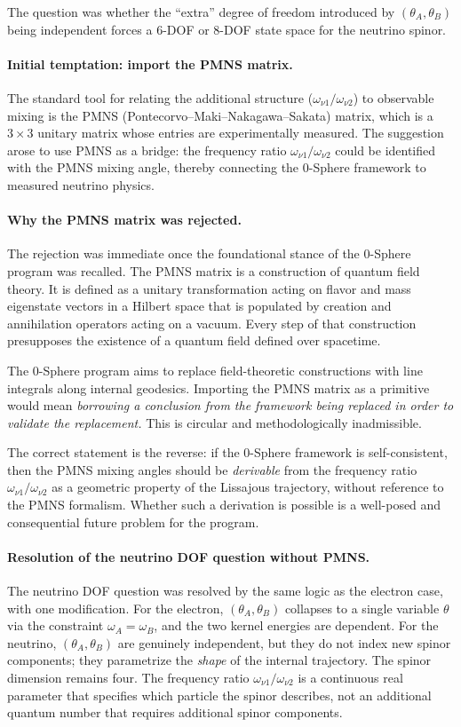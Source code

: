 \documentclass[%
 reprint, amsmath,amssymb, aps, prb, ]{revtex4-2}
\numberwithin{equation}{section}
\begin{document}
The question was whether the ``extra'' degree of freedom introduced by $(\theta_A, \theta_B)$ being independent forces a 6-DOF or 8-DOF state space for the neutrino spinor.

\paragraph{Initial temptation: import the PMNS matrix.}
The standard tool for relating the additional structure ($\omega_{\nu1}/\omega_{\nu2}$) to observable mixing is the PMNS (Pontecorvo--Maki--Nakagawa--Sakata) matrix, which is a $3 \times 3$ unitary matrix whose entries are experimentally measured. The suggestion arose to use PMNS as a bridge: the frequency ratio $\omega_{\nu1}/\omega_{\nu2}$ could be identified with the PMNS mixing angle, thereby connecting the 0-Sphere framework to measured neutrino physics.

\paragraph{Why the PMNS matrix was rejected.}
The rejection was immediate once the foundational stance of the 0-Sphere program was recalled. The PMNS matrix is a construction of quantum field theory. It is defined as a unitary transformation acting on flavor and mass eigenstate vectors in a Hilbert space that is populated by creation and annihilation operators acting on a vacuum. Every step of that construction presupposes the existence of a quantum field defined over spacetime.

The 0-Sphere program aims to replace field-theoretic constructions with line integrals along internal geodesics. Importing the PMNS matrix as a primitive would mean \emph{borrowing a conclusion from the framework being replaced in order to validate the replacement.} This is circular and methodologically inadmissible.

The correct statement is the reverse: if the 0-Sphere framework is self-consistent, then the PMNS mixing angles should be \emph{derivable} from the frequency ratio $\omega_{\nu1}/\omega_{\nu2}$ as a geometric property of the Lissajous trajectory, without reference to the PMNS formalism. Whether such a derivation is possible is a well-posed and consequential future problem for the program.

\paragraph{Resolution of the neutrino DOF question without PMNS.}
The neutrino DOF question was resolved by the same logic as the electron case, with one modification. For the electron, $(\theta_A, \theta_B)$ collapses to a single variable $\theta$ via the constraint $\omega_A = \omega_B$, and the two kernel energies are dependent. For the neutrino, $(\theta_A, \theta_B)$ are genuinely independent, but they do not index new spinor components; they parametrize the \emph{shape} of the internal trajectory. The spinor dimension remains four. The frequency ratio $\omega_{\nu1}/\omega_{\nu2}$ is a continuous real parameter that specifies which particle the spinor describes, not an additional quantum number that requires additional spinor components.
\end{document}
